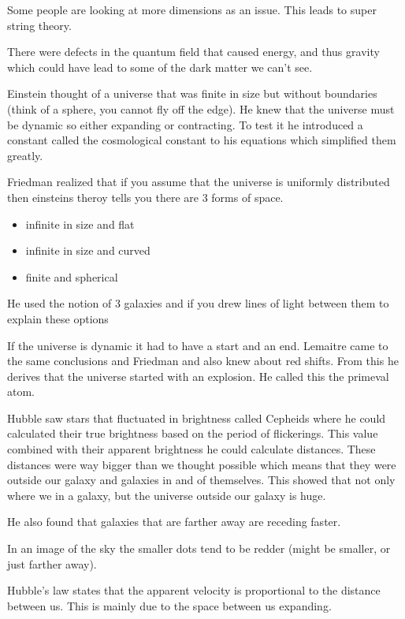 \documentclass{article}
\begin{document}
Some people are looking at more dimensions as an issue. This leads to super string theory.

There were defects in the quantum field that caused energy, and thus gravity which could have lead to some of the dark matter we can't see.




Einstein thought of a universe that was finite in size but without boundaries (think of a sphere, you cannot fly off the edge). He knew that the universe must be dynamic so either expanding or contracting. To test it he introduced a constant called the cosmological constant to his equations which simplified them greatly.



Friedman realized that if you assume that the universe is uniformly distributed then einsteins theroy tells you there are 3 forms of space.
\begin{itemize}
	\item infinite in size and flat
	\item infinite in size and curved
	\item finite and spherical
\end{itemize}
He used the notion of 3 galaxies and if you drew lines of light between them to explain these options


If the universe is dynamic it had to have a start and an end. Lemaitre came to the same conclusions and Friedman and also knew about red shifts. From this he derives that the universe started with an explosion. He called this the primeval atom.

Hubble saw stars that fluctuated in brightness called Cepheids where he could calculated their true brightness based on the period of flickerings. This value combined with their apparent brightness he could calculate distances. These distances were way bigger than we thought possible which means that they were outside our galaxy and galaxies in and of themselves. This showed that not only where we in a galaxy, but the universe outside our galaxy is huge.

He also found that galaxies that are farther away are receding faster.


In an image of the sky the smaller dots tend to be redder (might be smaller, or just farther away).


Hubble's law states that the apparent velocity is proportional to the distance between us. This is mainly due to the space between us expanding.
\end{document}
